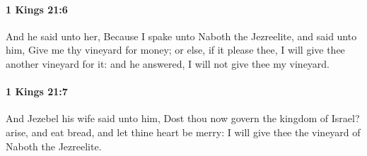 		\paragraph{1 Kings 21:6} %
			\label{1KINGS-21-6}

			And he said unto her, Because I spake unto Naboth the Jezreelite, and said unto him, Give me thy vineyard for money; or else, if it please thee, I will give thee another vineyard for it: and he answered, I will not give thee my vineyard.


		\paragraph{1 Kings 21:7} %
			\label{1KINGS-21-7}

			And Jezebel his wife said unto him, Dost thou now govern the kingdom of Israel? arise, and eat bread, and let thine heart be merry: I will give thee the vineyard of Naboth the Jezreelite.

